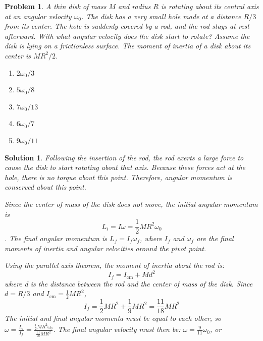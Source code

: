 \documentclass[12pt]{article}
\newcommand{\clearpts}{\addtocounter{tpts}{\value{cpts}} \setcounter{cpts}{0}}
\newcommand{\pts}[1]{\clearpts \setcounter{cpts}{#1}}
\newtheorem*{solution}{Solution}
\theoremstyle{mystyle}
\newtheorem{pproblem}{Problem}
\begin{document}
\pts{2}
\begin{pproblem}
    A thin disk of mass $M$ and radius $R$ is rotating about its central axis at an
    angular velocity $\omega_0$. The disk has a very small hole made at a distance $R/3$
    from its center. The hole is suddenly covered by a rod, and the rod stays at rest
    afterward. With what angular velocity does the disk start to rotate? Assume the disk
    is lying on a frictionless surface. The moment of inertia of a disk about its center
    is $MR^2/2$.
    \begin{enumerate}[label = (\Alph*)]
        \item $2\omega_0/3$
        \item $5\omega_0/8$
        \item $7\omega_0/13$
        \item $6\omega_0/7$
        \item $9\omega_0/11$
    \end{enumerate}
\end{pproblem}
\begin{solution}
    Following the insertion of the rod, the rod exerts a large force to cause the disk to start rotating about that axis. Because these forces act at the hole, there is no torque about this point. Therefore, angular momentum is conserved about this point.

    Since the center of mass of the disk does not move, the initial angular momentum is $$L_i = I\omega = \frac{1}{2}MR^2\omega_0$$. The final angular momentum is $L_f = I_f\omega_f$, where $I_f$ and $\omega_f$ are the final moments of inertia and angular velocities around the pivot point. 

    Using the parallel axis theorem, the moment of inertia about the rod is:
    $$I_f = I_{\text{cm}} + Md^2$$ where d is the distance between the rod and the center of mass of the disk. Since $d = R/3$ and $I_{\text{cm}} = \frac{1}{2}MR^2$, 
    $$I_f = \frac{1}{2}MR^2 + \frac{1}{9}MR^2 = \frac{11}{18}MR^2$$
    The initial and final angular momenta must be equal to each other, so $\omega = \frac{L_i}{I_f} = \frac{\frac{1}{2}MR^2\omega_0}{\frac{11}{18}MR^2}$. The final angular velocity must then be: $\omega = \frac{9}{11}\omega_0$, or 
\end{solution}
\end{document}

